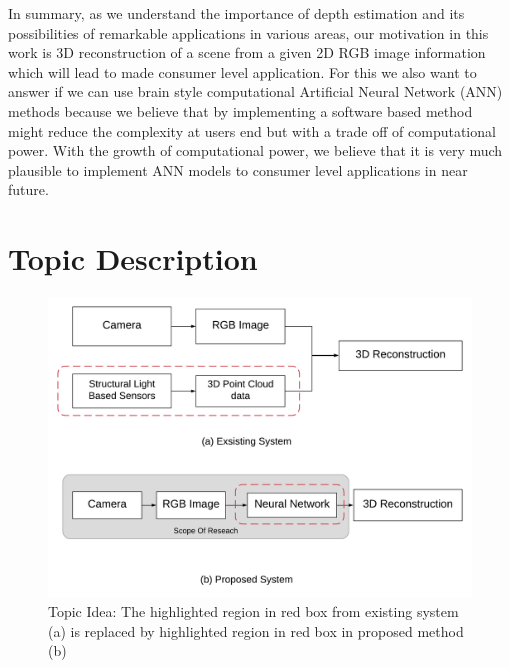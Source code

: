 In summary, as we understand the importance of depth estimation and its possibilities of remarkable applications in various areas, our motivation in this work is 3D reconstruction of a scene from a given 2D RGB image information which will lead to made consumer level application. For this we also want to answer if we can use brain style computational Artificial Neural Network (ANN) methods because we believe that by implementing a software based method might reduce the complexity at users end but with a trade off of computational power. With the growth of computational power, we believe that it is very much plausible to implement ANN models to consumer level applications in near future.

\section{Topic Description}
\label{Chapeter1:Topic_Description}
\begin{figure}[h]
    \centering
    \includegraphics[width = 12cm]{Figures/idea.png}
    \caption{Topic Idea: The highlighted region in red box from existing system (a) is replaced by highlighted region in red box in proposed method (b)}
    \label{fig:Proposed_Model}
\end{figure}{}
